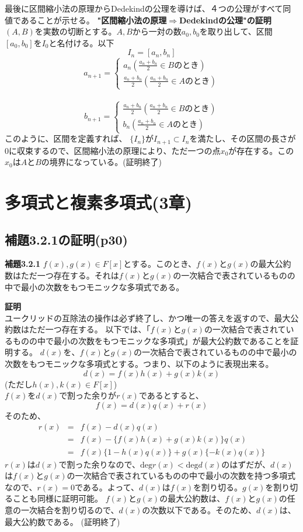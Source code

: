 \documentclass[10pt]{jarticle}
\begin{document}
最後に区間縮小法の原理からDedekindの公理を導けば、４つの公理がすべて同値であることが示せる。
\textbf{"区間縮小法の原理$\Longrightarrow$Dedekindの公理"の証明}\\
$(A,B)$を実数の切断とする。$A,B$から一対の数$a_0,b_0$を取り出して、区間$[a_0,b_0]$を$I_0$と名付ける。以下
\[I_n=[a_n,b_n]\]
\[
  a_{n+1}=\begin{cases}
    a_n　(\frac{a_n+b_n}{2}\in Bのとき)\\
    \frac{a_n+b_n}{2}(\frac{a_n+b_n}{2}\in Aのとき)
  \end{cases}
\]\\
\[
  b_{n+1}=\begin{cases}
     \frac{a_n+b_n}{2}(\frac{a_n+b_n}{2}\in Bのとき)\\
    b_n(\frac{a_n+b_n}{2}\in Aのとき)
  \end{cases}
\]
このように、区間を定義すれば、
$\{I_n\}$が$I_{n+1}\subset I_n$を満たし、その区間の長さが$0$に収束するので、区間縮小法の原理により、ただ一つの点$x_0$が存在する。この$x_0$は$A$と$B$の境界になっている。(証明終了)

\newpage


\section{多項式と複素多項式(3章)}
\subsection{補題3.2.1の証明(p30)}

\begin{itembox}[l]{\textbf{補題3.2.1}}
$f(x),g(x)\in F[x]$とする。このとき、$f(x)$と$g(x)$の最大公約数はただ一つ存在する。それは$f(x)$と$g(x)$の一次結合で表されているものの中で最小の次数をもつモニックな多項式である。
\end{itembox}

\textbf{証明}\\
ユークリッドの互除法の操作は必ず終了し、かつ唯一の答えを返すので、最大公約数はただ一つ存在する。
以下では、「$f(x)$と$g(x)$の一次結合で表されているものの中で最小の次数をもつモニックな多項式」が最大公約数であることを証明する。
$d(x)$を、$f(x)$と$g(x)$の一次結合で表されているものの中で最小の次数をもつモニックな多項式とする。つまり、以下のように表現出来る。
\[d(x)=f(x)h(x)+g(x)k(x)\]
(ただし$h(x),k(x)\in F[x]$)\\
$f(x)$を$d(x)$で割った余りが$r(x)$であるとすると、
\[f(x)=d(x)q(x)+r(x)\]
そのため、
\begin{eqnarray*}r(x) &=& f(x)-d(x)q(x)\\
&=&f(x)-\{f(x)h(x)+g(x)k(x)\}q(x)\\
&=& f(x)\{1-h(x)q(x)\}+g(x)\{-k(x)q(x)\}
\end{eqnarray*}
$r(x)$は$d(x)$で割った余りなので、$\mathrm{deg}r(x)<\mathrm{deg}d(x)$のはずだが、$d(x)$は$f(x)$と$g(x)$の一次結合で表されているものの中で最小の次数を持つ多項式なので、$r(x)=0$である。よって、$d(x)$は$f(x)$を割り切る。$g(x)$を割り切ることも同様に証明可能。
$f(x)$と$g(x)$の最大公約数は、$f(x)$と$g(x)$の任意の一次結合を割り切るので、$d(x)$の次数以下である。そのため、$d(x)$は、最大公約数である。
(証明終了)\\
\end{document}
